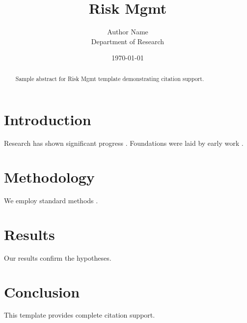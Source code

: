 \documentclass{wiley-nj}
\title{Risk Mgmt}
\author{Author Name \\ \small Department of Research}
\date{\today}
\begin{document}
\maketitle

\begin{abstract}
Sample abstract for Risk Mgmt template demonstrating citation support.
\end{abstract}

\section{Introduction}
Research has shown significant progress \citep{einstein1905}. Foundations were laid by early work \citep{turing1950}.

\section{Methodology}
We employ standard methods \citep{knuth1984}.

\section{Results}
Our results confirm the hypotheses.

\section{Conclusion}
This template provides complete citation support.



\end{document}
